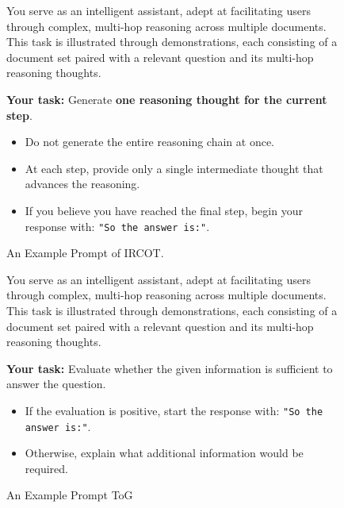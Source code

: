 \documentclass{article} %
\begin{document}
\begin{figure}[!b]
\begin{tcolorbox}[mybox={Prompts}]
You serve as an intelligent assistant, adept at facilitating users through complex, multi-hop reasoning across multiple documents.  
This task is illustrated through demonstrations,  each consisting of a document set paired with a relevant question and its multi-hop reasoning thoughts.

\textbf{Your task:}  
Generate \textbf{one reasoning thought for the current step}.  
\begin{itemize}
  \item Do not generate the entire reasoning chain at once.  
  \item At each step, provide only a single intermediate thought that advances the reasoning.  
  \item If you believe you have reached the final step, begin your response with: \texttt{"So the answer is:"}.  
\end{itemize}
\end{tcolorbox}
\caption{An Example Prompt of IRCOT.}
\label{fig:IRCOT}
\end{figure}

\begin{figure}[!b]
\begin{tcolorbox}[mybox={Prompts}]
You serve as an intelligent assistant, adept at facilitating users through complex, multi-hop reasoning across multiple documents.  
This task is illustrated through demonstrations, each consisting of a document set paired with a relevant question and its multi-hop reasoning thoughts.

\textbf{Your task:}  
Evaluate whether the given information is sufficient to answer the question.
\begin{itemize}
  \item If the evaluation is positive, start the response with: \texttt{"So the answer is:"}.  
  \item Otherwise, explain what additional information would be required.  
\end{itemize}
\end{tcolorbox}
\caption{An Example Prompt ToG}
\label{fig:TOG}
\end{figure}
\end{document}
